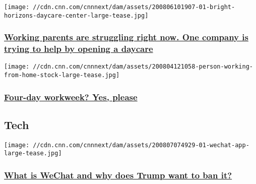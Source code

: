 \texttt{[image: //cdn.cnn.com/cnnnext/dam/assets/200806101907-01-bright-horizons-daycare-center-large-tease.jpg]}

\hypertarget{working-parents-are-struggling-right-now-one-company-is-trying-to-help-by-opening-a-daycare}{%
\subsubsection{\texorpdfstring{\href{/2020/08/06/success/childcare-coronavirus/index.html}{Working
parents are struggling right now. One company is trying to help by
opening a
daycare}}{Working parents are struggling right now. One company is trying to help by opening a daycare}}\label{working-parents-are-struggling-right-now-one-company-is-trying-to-help-by-opening-a-daycare}}

\href{/2020/08/04/success/four-day-work-week-coronavirus-work-transformed/index.html}{}

\texttt{[image: //cdn.cnn.com/cnnnext/dam/assets/200804121058-person-working-from-home-stock-large-tease.jpg]}

\hypertarget{four-day-workweek-yes-please}{%
\subsubsection{\texorpdfstring{\href{/2020/08/04/success/four-day-work-week-coronavirus-work-transformed/index.html}{Four-day
workweek? Yes,
please}}{Four-day workweek? Yes, please}}\label{four-day-workweek-yes-please}}

\href{https://www.cnn.com/business/tech}{}

\hypertarget{tech}{%
\subsection{Tech}\label{tech}}

\href{/2020/08/07/tech/wechat-trump-ban-explainer/index.html}{}

\texttt{[image: //cdn.cnn.com/cnnnext/dam/assets/200807074929-01-wechat-app-large-tease.jpg]}

\hypertarget{what-is-wechat-and-why-does-trump-want-to-ban-it}{%
\subsubsection{\texorpdfstring{\href{/2020/08/07/tech/wechat-trump-ban-explainer/index.html}{What
is WeChat and why does Trump want to ban
it?}}{What is WeChat and why does Trump want to ban it?}}\label{what-is-wechat-and-why-does-trump-want-to-ban-it}}

